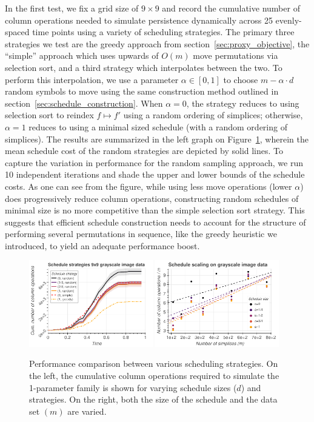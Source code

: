 \documentclass[sn-mathphys]{sn-jnl}
\begin{document}
 In the first test, we fix a grid size of $9 \times 9$ and record the cumulative number of column operations needed to simulate persistence dynamically across 25 evenly-spaced time points using a variety of scheduling strategies.
 The primary three strategies we test are the greedy approach from section~\ref{sec:proxy_objective}, the ``simple'' approach which uses upwards of $O(m)$ move permutations via selection sort, and a third strategy which interpolates between the two. 
To perform this interpolation, we use a parameter $\alpha \in [0,1]$ to choose $m - \alpha \cdot d$ random symbols to move using the same construction method outlined in section~\ref{sec:schedule_construction}. When $\alpha = 0$, the strategy reduces to using selection sort to reindex $f \mapsto f'$ using a random ordering of simplices; otherwise, $\alpha = 1$ reduces to using a minimal sized schedule (with a random ordering of simplices). The results are summarized in the left graph on Figure~\ref{fig:movie_perf}, wherein the mean schedule cost of the random strategies are depicted by solid lines. To capture the variation in performance for the random sampling approach, we run 10 independent iterations and shade the upper and lower bounds of the schedule costs. 
 As one can see from the figure, while using less move operations (lower $\alpha$) does progressively reduce column operations, constructing random schedules of minimal size is no more competitive than the simple selection sort strategy. This suggests that efficient schedule construction needs to account for the structure of performing several permutations in sequence, like the greedy heuristic we introduced, to yield an adequate performance boost. 

\begin{figure}
	\centering
	\includegraphics[width=0.48\textwidth]{varying_d.pdf}
	\includegraphics[width=0.48\textwidth]{varying_nd.pdf}
	\caption{Performance comparison between various scheduling strategies. On the left, the cumulative column operations required to simulate the 1-parameter family is shown for varying schedule sizes ($d$) and strategies. On the right, both the size of the schedule and the data set $(m)$ are varied. }
	\label{fig:movie_perf}
\end{figure}
\end{document}
